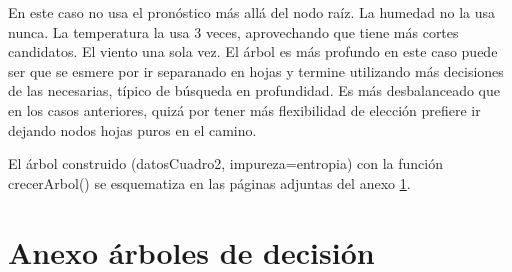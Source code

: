 \documentclass[11pt,a4paper,final]{article}
\begin{document}
En este caso no usa el pronóstico más allá del nodo raíz. La humedad no la usa nunca. La temperatura la usa 3 veces, aprovechando que tiene más cortes candidatos. El viento una sola vez. El árbol es más profundo en este caso puede ser que se esmere por ir separanado en hojas y termine utilizando más decisiones de las necesarias, típico de búsqueda en profundidad. Es más desbalanceado que en los casos anteriores, quizá por tener más flexibilidad de elección prefiere ir dejando nodos hojas puros en el camino.

El árbol construido (datosCuadro2, impureza=entropia) con la función crecerArbol() se esquematiza en las páginas adjuntas del anexo \ref{anexo}.

\clearpage
\appendix
\section{Anexo árboles de decisión}
\label{anexo}
\end{document}
